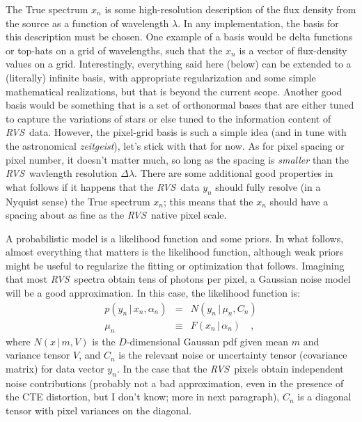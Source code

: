 \documentclass[11pt]{article}
\newcommand{\given}{\,|\,}
\newcommand{\foreign}[1]{\textsl{#1}}
\newcommand{\instrument}[1]{\textsl{#1}}
\newcommand{\RVS}{\instrument{RVS}}
\begin{document}
The True spectrum $x_n$ is some high-resolution description of the
flux density from the source as a function of wavelength $\lambda$.
In any implementation, the basis for this description must be chosen.
One example of a basis would be delta functions or top-hats on a grid
of wavelengths, such that the $x_n$ is a vector of flux-density values
on a grid.
Interestingly, everything said here (below) can be extended to a
(literally) infinite basis, with appropriate regularization and some
simple mathematical realizations, but that is beyond the current
scope.
Another good basis would be something that is a set of orthonormal
bases that are either tuned to capture the variations of stars or else
tuned to the information content of \RVS\ data.
However, the pixel-grid basis is such a simple idea (and in tune with
the astronomical \foreign{zeitgeist}), let's stick with that for now.
As for pixel spacing or pixel number, it doesn't matter much, so long
as the spacing is \emph{smaller} than the \RVS\ wavlength resolution
$\Delta\lambda$.
There are some additional good properties in what follows if it
happens that the \RVS\ data $y_n$ should fully resolve (in a Nyquist
sense) the True spectrum $x_n$; this means that the $x_n$ should
have a spacing about as fine as the \RVS\ native pixel scale.

A probabilistic model is a likelihood function and some priors.
In what follows, almost everything that matters is the likelihood
function, although weak priors might be useful to regularize the
fitting or optimization that follows.
Imagining that most \RVS\ spectra obtain tens of photons per pixel, a
Gaussian noise model will be a good approximation.
In this case, the likelihood function is:
\begin{eqnarray}
p(y_n\given x_n, \alpha_n) &=& N(y_n\given \mu_n, C_n)
\\
\mu_n &\equiv& F(x_n\given \alpha_n)
\quad ,
\end{eqnarray}
where $N(x\given m,V)$ is the $D$-dimensional Gaussan pdf given mean
$m$ and variance tensor $V$, and $C_n$ is the relevant noise or
uncertainty tensor (covariance matrix) for data vector $y_n$.  In the
case that the \RVS\ pixels obtain independent noise contributions
(probably not a bad approximation, even in the presence of the CTE
distortion, but I don't know; more in next paragraph), $C_n$ is a
diagonal tensor with pixel variances on the diagonal.
\end{document}

